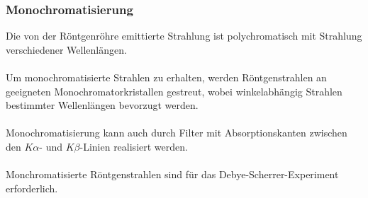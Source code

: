 \documentclass[a4paper,titlepage]{scrartcl}
\numberwithin{equation}{section}
\begin{document}
\subsubsection{Monochromatisierung}
Die von der Röntgenröhre emittierte Strahlung ist polychromatisch mit Strahlung verschiedener Wellenlängen.\\ \\
Um monochromatisierte Strahlen zu erhalten, werden Röntgenstrahlen an geeigneten Monochromatorkristallen gestreut, wobei winkelabhängig Strahlen bestimmter Wellenlängen bevorzugt werden.\\ \\
Monochromatisierung kann auch durch Filter mit Absorptionskanten zwischen den $K \alpha$- und $K \beta$-Linien realisiert werden.\\ \\
Monchromatisierte Röntgenstrahlen sind für das Debye-Scherrer-Experiment erforderlich.
\end{document}
